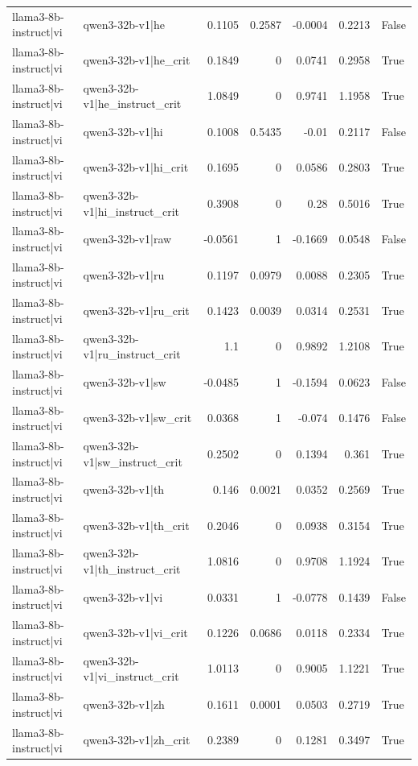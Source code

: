 \begin{table}
\begin{tabular}{l l r r r r l}
llama3-8b-instruct|vi & qwen3-32b-v1|he & 0.1105 & 0.2587 & -0.0004 & 0.2213 & False \\
llama3-8b-instruct|vi & qwen3-32b-v1|he_crit & 0.1849 & 0 & 0.0741 & 0.2958 & True \\
llama3-8b-instruct|vi & qwen3-32b-v1|he_instruct_crit & 1.0849 & 0 & 0.9741 & 1.1958 & True \\
llama3-8b-instruct|vi & qwen3-32b-v1|hi & 0.1008 & 0.5435 & -0.01 & 0.2117 & False \\
llama3-8b-instruct|vi & qwen3-32b-v1|hi_crit & 0.1695 & 0 & 0.0586 & 0.2803 & True \\
llama3-8b-instruct|vi & qwen3-32b-v1|hi_instruct_crit & 0.3908 & 0 & 0.28 & 0.5016 & True \\
llama3-8b-instruct|vi & qwen3-32b-v1|raw & -0.0561 & 1 & -0.1669 & 0.0548 & False \\
llama3-8b-instruct|vi & qwen3-32b-v1|ru & 0.1197 & 0.0979 & 0.0088 & 0.2305 & True \\
llama3-8b-instruct|vi & qwen3-32b-v1|ru_crit & 0.1423 & 0.0039 & 0.0314 & 0.2531 & True \\
llama3-8b-instruct|vi & qwen3-32b-v1|ru_instruct_crit & 1.1 & 0 & 0.9892 & 1.2108 & True \\
llama3-8b-instruct|vi & qwen3-32b-v1|sw & -0.0485 & 1 & -0.1594 & 0.0623 & False \\
llama3-8b-instruct|vi & qwen3-32b-v1|sw_crit & 0.0368 & 1 & -0.074 & 0.1476 & False \\
llama3-8b-instruct|vi & qwen3-32b-v1|sw_instruct_crit & 0.2502 & 0 & 0.1394 & 0.361 & True \\
llama3-8b-instruct|vi & qwen3-32b-v1|th & 0.146 & 0.0021 & 0.0352 & 0.2569 & True \\
llama3-8b-instruct|vi & qwen3-32b-v1|th_crit & 0.2046 & 0 & 0.0938 & 0.3154 & True \\
llama3-8b-instruct|vi & qwen3-32b-v1|th_instruct_crit & 1.0816 & 0 & 0.9708 & 1.1924 & True \\
llama3-8b-instruct|vi & qwen3-32b-v1|vi & 0.0331 & 1 & -0.0778 & 0.1439 & False \\
llama3-8b-instruct|vi & qwen3-32b-v1|vi_crit & 0.1226 & 0.0686 & 0.0118 & 0.2334 & True \\
llama3-8b-instruct|vi & qwen3-32b-v1|vi_instruct_crit & 1.0113 & 0 & 0.9005 & 1.1221 & True \\
llama3-8b-instruct|vi & qwen3-32b-v1|zh & 0.1611 & 0.0001 & 0.0503 & 0.2719 & True \\
llama3-8b-instruct|vi & qwen3-32b-v1|zh_crit & 0.2389 & 0 & 0.1281 & 0.3497 & True \\

\end{tabular}
\end{table}
